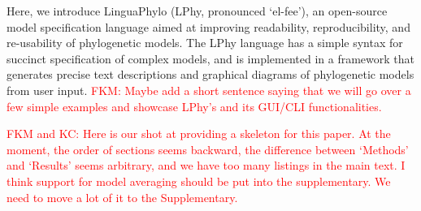 \documentclass[10pt,letterpaper,table]{article}
\begin{document}
Here, we introduce LinguaPhylo (LPhy, pronounced `el-fee'), an open-source model specification 
language aimed at improving readability, reproducibility, and re-usability of phylogenetic models. 
The LPhy language has a simple syntax for succinct specification of complex models, and is implemented in a framework that generates precise text descriptions and graphical diagrams of phylogenetic models from user input.
\textcolor{red}{FKM: Maybe add a short sentence saying that we will go over a few simple examples and showcase LPhy's and its GUI/CLI functionalities.}
\newline
\newline

\textcolor{red}{FKM and KC: Here is our shot at providing a skeleton for this paper. At the moment, the order of sections seems backward, the difference between `Methods' and `Results' seems arbitrary, and we have too many listings in the main text. I think support for model averaging should be put into the supplementary. We need to move a lot of it to the Supplementary.}

\bigskip
\end{document}
